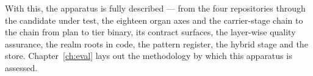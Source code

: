 With this, the apparatus is fully described --- from the four repositories through the candidate under test, the
eighteen organ axes and the carrier-stage chain to the chain from plan to tier binary, its contract
surfaces, the layer-wise quality assurance, the realm roots in code, the pattern register, the hybrid
stage and the store. Chapter~\ref{ch:eval} lays out the methodology by which this apparatus is
assessed.
